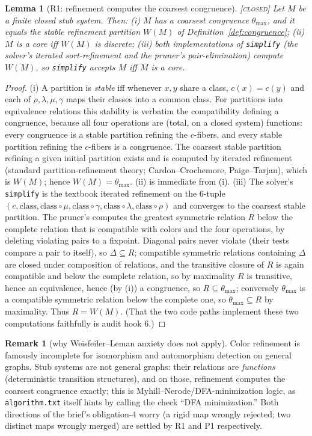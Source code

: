\documentclass[11pt]{article}
\newtheorem{lemma}[theorem]{Lemma}
\theoremstyle{definition}
\newtheorem{remark}[theorem]{Remark}
\newcommand{\CLOSED}{\textnormal{\textsc{[closed]}}}
\begin{document}
\begin{lemma}[R1: refinement computes the coarsest congruence]\label{lem:R1} \CLOSED\;
Let $M$ be a finite closed stub system. Then: (i) $M$ has a coarsest congruence
$\theta_{\max}$, and it equals the stable refinement partition $W(M)$ of
Definition~\ref{def:congruence}; (ii) $M$ is a core iff $W(M)$ is discrete; (iii) both
implementations of \texttt{simplify} (the solver's iterated sort-refinement and the
pruner's pair-elimination) compute $W(M)$, so \texttt{simplify} accepts $M$ iff $M$ is a
core.
\end{lemma}

\begin{proof}
(i) A partition is \emph{stable} iff whenever $x, y$ share a class, $c(x) = c(y)$ and
each of $\rho, \lambda, \mu, \gamma$ maps their classes into a common class. For
partitions into equivalence relations this stability is verbatim the compatibility
defining a congruence, because all four operations are (total, on a closed system)
functions: every congruence is a stable partition refining the $c$-fibers, and every
stable partition refining the $c$-fibers is a congruence. The coarsest stable partition
refining a given initial partition exists and is computed by iterated refinement
(standard partition-refinement theory; Cardon--Crochemore, Paige--Tarjan), which is
$W(M)$; hence $W(M) = \theta_{\max}$. (ii) is immediate from (i). (iii) The solver's
\texttt{simplify} is the textbook iterated refinement on the 6-tuple
$(c, \text{class}, \text{class}\circ\mu, \text{class}\circ\gamma,
\text{class}\circ\lambda, \text{class}\circ\rho)$ and converges to the coarsest stable
partition. The pruner's computes the greatest symmetric relation $R$ below the complete
relation that is compatible with colors and the four operations, by deleting violating
pairs to a fixpoint. Diagonal pairs never violate (their tests compare a pair to itself),
so $\Delta \subseteq R$; compatible symmetric relations containing $\Delta$ are closed
under composition of relations, and the transitive closure of $R$ is again compatible and
below the complete relation, so by maximality $R$ is transitive, hence an equivalence,
hence (by (i)) a congruence, so $R \subseteq \theta_{\max}$; conversely
$\theta_{\max}$ is a compatible symmetric relation below the complete one, so
$\theta_{\max} \subseteq R$ by maximality. Thus $R = W(M)$. (That the two code paths
implement these two computations faithfully is audit hook 6.)
\end{proof}

\begin{remark}[why Weisfeiler--Leman anxiety does not apply]
Color refinement is famously incomplete for isomorphism and automorphism detection on
general graphs. Stub systems are not general graphs: their relations are \emph{functions}
(deterministic transition structures), and on those, refinement computes the coarsest
congruence exactly; this is Myhill--Nerode/DFA-minimization logic, as
\texttt{algorithm.txt} itself hints by calling the check ``DFA minimization.'' Both
directions of the brief's obligation-4 worry (a rigid map wrongly rejected; two distinct
maps wrongly merged) are settled by R1 and P1 respectively.
\end{remark}
\end{document}
